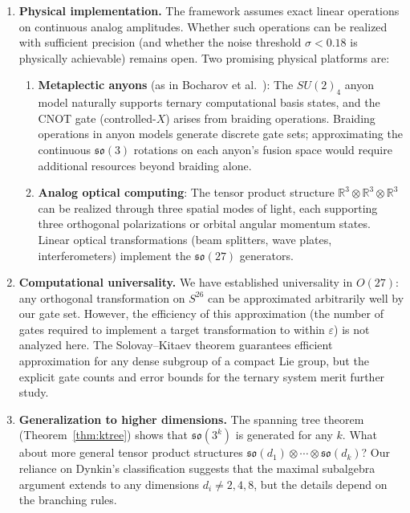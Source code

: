 \documentclass[12pt,a4paper]{article}
\begin{document}
\begin{enumerate}
\item \textbf{Physical implementation.} The framework assumes exact
linear operations on continuous analog amplitudes. Whether such
operations can be realized with sufficient precision (and whether the
noise threshold $\sigma < 0.18$ is physically achievable) remains open.
Two promising physical platforms are:
  \begin{enumerate}[label=\alph*.]
  \item \textbf{Metaplectic anyons} (as in Bocharov et
  al.~\cite{bocharov2016improved}): The $SU(2)_4$ anyon model naturally
  supports ternary computational basis states, and the CNOT gate
  (controlled-$X$) arises from braiding operations. Braiding operations
  in anyon models generate discrete gate sets; approximating the
  continuous $\mathfrak{so}(3)$ rotations on each anyon's fusion space
  would require additional resources beyond braiding alone.
  \item \textbf{Analog optical computing}: The tensor product structure
  $\mathbb{R}^3 \otimes \mathbb{R}^3 \otimes \mathbb{R}^3$ can be
  realized through three spatial modes of light, each supporting three
  orthogonal polarizations or orbital angular momentum states. Linear
  optical transformations (beam splitters, wave plates, interferometers)
  implement the $\mathfrak{so}(27)$ generators.
  \end{enumerate}

\item \textbf{Computational universality.} We have established
universality in $O(27)$: any orthogonal transformation on $S^{26}$
can be approximated arbitrarily well by our gate set. However, the
efficiency of this approximation (the number of gates required to
implement a target transformation to within $\varepsilon$) is not
analyzed here. The Solovay--Kitaev theorem guarantees efficient
approximation for any dense subgroup of a compact Lie group, but
the explicit gate counts and error bounds for the ternary system
merit further study.

\item \textbf{Generalization to higher dimensions.} The spanning tree
theorem (Theorem~\ref{thm:ktree}) shows that $\mathfrak{so}(3^k)$ is
generated for any $k$. What about more general tensor product structures
$\mathfrak{so}(d_1) \otimes \cdots \otimes \mathfrak{so}(d_k)$? Our
reliance on Dynkin's classification suggests that the maximal subalgebra
argument extends to any dimensions $d_i \neq 2,4,8$, but the details
depend on the branching rules.
\end{enumerate}
\end{document}
